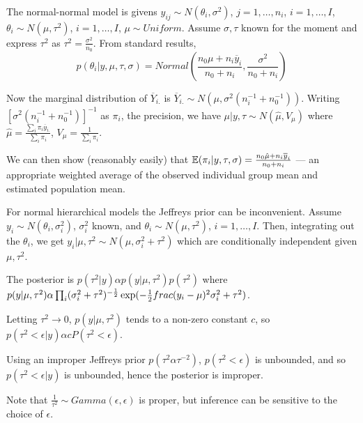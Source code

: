 \begin{defn}
  \label{sec:heirachcial-models-2}
  The normal-normal model is givens $y_{ij} \sim N(\theta_{i},
  \sigma^{2})$, $j = 1, \dots, n_{i}$, $i = 1, \dots, I$, $\theta_{i}
  \sim N(\mu, \tau^{2})$, $i = 1, \dots, I$, $\mu \sim Uniform$.
  Assume $\sigma, \tau$ known for the moment and express $\tau^{2}$
  as $\tau^{2} = \frac{\sigma^{2}}{n_{0}}$.  From standard results,
  \begin{equation}
    \label{eq:21}
    p(\theta_{i} | y, \mu, \tau, \sigma) = Normal(\frac{n_{0} \mu +
      n_{i} \overline y_{i}}{n_{0} + n_{i}}, \frac{\sigma^{2}}{n_{0} +
      n_{i}})
  \end{equation}

  Now the marginal distribution of $\overline Y_{i.}$ is $\overline
  Y_{i.} \sim N(\mu, \sigma^{2}(n_{i}^{-1} + n_{0}^{-1}))$.  Writing
  $[\sigma^{2}(n_{i}^{-1} + n_{0}^{-1})]^{-1}$ as $\pi_{i}$, the
  precision, we have $\mu | y, \tau \sim N(\hat \mu, V_{\mu})$ where
  $\hat \mu = \frac{\sum_{i}^{} \pi_{i} \overline y_{i.}}{\sum_{i}^{}
    \pi_{i}} $, $V_{\mu} = \frac{1}{\sum_{i}^{} \pi_{i}}$.

  We can then show (reasonably easily) that $\E{\pi_{i}| y, \tau,
    \sigma} = \frac{n_{0} \hat \mu + n_{i} \overline y_{i}}{n_{0} +
    n_{i}}$ --- an appropriate weighted average of the observed
  individual group mean and estimated population mean.
\end{defn}

\begin{defn}
  \label{sec:heirachcial-models-3}
  For normal hierarchical models the Jeffreys prior can be
  inconvenient.  Assume $y_{i} \sim N(\theta_{i}, \sigma_{i}^{2})$,
  $\sigma_{i}^{2}$ known, and $\theta_{i} \sim N(\mu, \tau^{2})$, $i =
  1, \dots, I$.  Then, integrating out the $\theta_{i}$, we get $y_{i}
  | \mu, \tau^{2} \sim N(\mu, \sigma_{i}^{2} + \tau^{2})$ which are
  conditionally independent given $\mu, \tau^{2}$.

  The posterior is $p(\tau^{2} | y) \alpha p(y | \mu, \tau^{2})
  p(\tau^{2})$ where $p(y | \mu, \tau^{2}) \alpha \prod_{i}
  (\sigma_{i}^{2} + \tau^{2})^{-\frac{1}{2}} \exp(-\frac{1}{2}
  \\frac{(y_{i} - \mu)^{2}}{\sigma_{i}^{2} + \tau^{2}})$.

  Letting $\tau^{2} \rightarrow 0$, $p(y | \mu, \tau^{2})$ tends to a
  non-zero constant $c$, so $p(\tau^{2} < \epsilon | y) \alpha
  cP(\tau^{2} < \epsilon)$.

  Using an improper Jeffreys prior $p(\tau^{2} \alpha \tau^{-2})$,
  $p(\tau^{2} < \epsilon)$ is unbounded, and so $p(\tau^{2} < \epsilon
  | y)$ is unbounded, hence the posterior is improper.  

  Note that $\frac{1}{\tau^{2}} \sim Gamma(\epsilon, \epsilon)$ is
  proper, but inference can be sensitive to the choice of $\epsilon$.
\end{defn}

